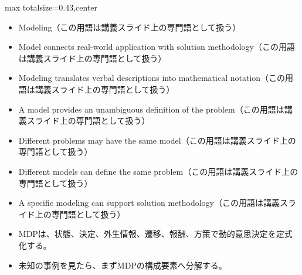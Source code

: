 \clearpage
{}
\begin{minipage}[t]{0.405\textwidth}
\begin{adjustbox}{max totalsize={\textwidth}{0.43\textheight},center}
\begin{minipage}{\textwidth}\scriptsize
{}\begin{itemize}
\item Modeling（この用語は講義スライド上の専門語として扱う）
\item Model connects real-world application with solution methodology（この用語は講義スライド上の専門語として扱う）
\item Modeling translates verbal descriptions into mathematical notation（この用語は講義スライド上の専門語として扱う）
\item A model provides an unambiguous definition of the problem（この用語は講義スライド上の専門語として扱う）
\item Different problems may have the same model（この用語は講義スライド上の専門語として扱う）
\item Different models can define the same problem（この用語は講義スライド上の専門語として扱う）
\item A specific modeling can support solution methodology（この用語は講義スライド上の専門語として扱う）
\end{itemize}\begin{itemize}
\item MDPは、状態、決定、外生情報、遷移、報酬、方策で動的意思決定を定式化する。
\item 未知の事例を見たら、まずMDPの構成要素へ分解する。
\end{itemize}
\end{minipage}
\end{adjustbox}
\end{minipage}\hfill
